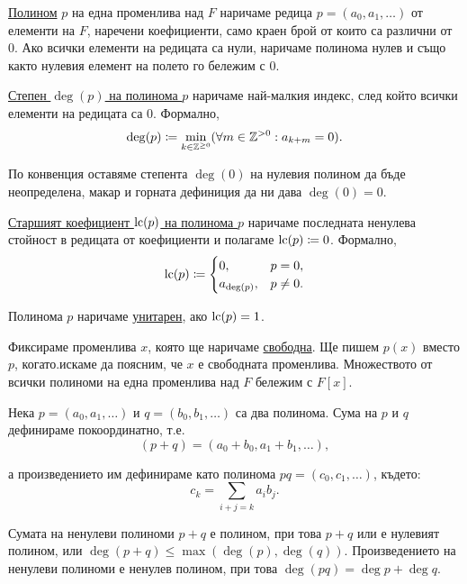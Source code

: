 \documentclass[numbers=endperiod, DIV=15, bibliography=totocnumbered]{scrartcl}
\begin{document}
\begin{definition}
  \uline{Полином} $p$ на една променлива над $F$ наричаме редица $p = (a_0, a_1, \ldots)$ от елементи на $F$, наречени коефициенти, само краен брой от които са различни от $0$. Ако всички елементи на редицата са нули, наричаме полинома нулев и също както нулевия елемент на полето го бележим с $0$.

  \uline{Степен $\deg(p)$ на полинома $p$} наричаме най-малкия индекс, след който всички елементи на редицата са $0$. Формално,
  \begin{displaymath}
    \deg(p) \coloneqq \min_{k \in \mathbb{Z}^{\geq 0}} (\forall m \in \mathbb{Z}^{> 0} : a_{k + m} = 0).
  \end{displaymath}

  По конвенция оставяме степента $\deg(0)$ на нулевия полином да бъде неопределена, макар и горната дефиниция да ни дава $\deg(0) = 0$.

  \uline{Старшият коефициент $\operatorname{lc}(p)$ на полинома $p$} наричаме последната ненулева стойност в редицата от коефициенти и полагаме $\operatorname{lc}(p) \coloneqq 0$. Формално,
  \begin{displaymath}
    \operatorname{lc}(p) \coloneqq
    \begin{cases}
      0, &p = 0, \\
      a_{\deg(p)}, &p \neq 0.
    \end{cases}
  \end{displaymath}

  Полинома $p$ наричаме \uline{унитарен}, ако $\operatorname{lc}(p) = 1$.
\end{definition}

Фиксираме променлива $x$, която ще наричаме \uline{свободна}.
Ще пишем $p(x)$ вместо $p$, когато.искаме да поясним, че $x$ е свободната променлива. Множеството от всички полиноми на една променлива над $F$ бележим с $F[x]$.

Нека $p = (a_0, a_1, \ldots)$ и $q = (b_0, b_1, \ldots)$ са два полинома. Сума на $p$ и $q$ дефинираме покоординатно, т.е.
\begin{displaymath}
  (p + q) = (a_0 + b_0, a_1 + b_1, \ldots),
\end{displaymath}

а произведението им дефинираме като полинома $pq = (c_0, c_1, \ldots)$, където:
\begin{displaymath}
  c_k = \sum_{i+j=k} a_i b_j.
\end{displaymath}

Сумата на ненулеви полиноми $p + q$ е полином, при това $p + q$ или е нулевият полином, или $\deg(p + q) \leq \max(\deg(p), \deg(q))$. Произведението на ненулеви полиноми е ненулев полином, при това $\deg(pq) = \deg p + \deg q$.
\end{document}
